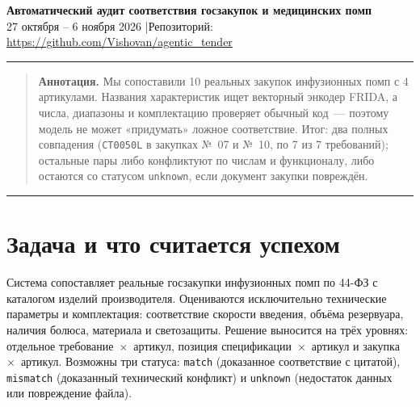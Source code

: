 \documentclass[10pt,a4paper]{article}
\begin{document}
\begin{center}
{\LARGE\bfseries Автоматический аудит соответствия госзакупок и медицинских помп}\\[0.35em]
{\small 27 октября -- 6 ноября 2026 \quad|\quad Репозиторий: \url{https://github.com/Vishovan/agentic_tender}}
\end{center}
\vspace{-0.2em}
\hrule
\vspace{0.35em}

\begin{quote}\small
\textbf{Аннотация.} Мы сопоставили 10 реальных закупок инфузионных помп с 4 артикулами. Названия характеристик ищет векторный энкодер FRIDA, а числа, диапазоны и комплектацию проверяет обычный код~--- поэтому модель не может «придумать» ложное соответствие. Итог: два полных совпадения (\texttt{CT0050L} в закупках №~07 и №~10, по 7 из 7 требований); остальные пары либо конфликтуют по числам и функционалу, либо остаются со статусом \texttt{unknown}, если документ закупки повреждён.
\end{quote}
\vspace{-0.2em}
\hrule
\vspace{0.35em}

\section{Задача и что считается успехом}

Система сопоставляет реальные госзакупки инфузионных помп по 44-ФЗ с каталогом изделий производителя. Оцениваются исключительно технические параметры и комплектация: соответствие скорости введения, объёма резервуара, наличия болюса, материала и светозащиты. Решение выносится на трёх уровнях: отдельное требование~$\times$~артикул, позиция спецификации~$\times$~артикул и закупка~$\times$~артикул. Возможны три статуса: \texttt{match} (доказанное соответствие с цитатой), \texttt{mismatch} (доказанный технический конфликт) и \texttt{unknown} (недостаток данных или повреждение файла).
\end{document}
